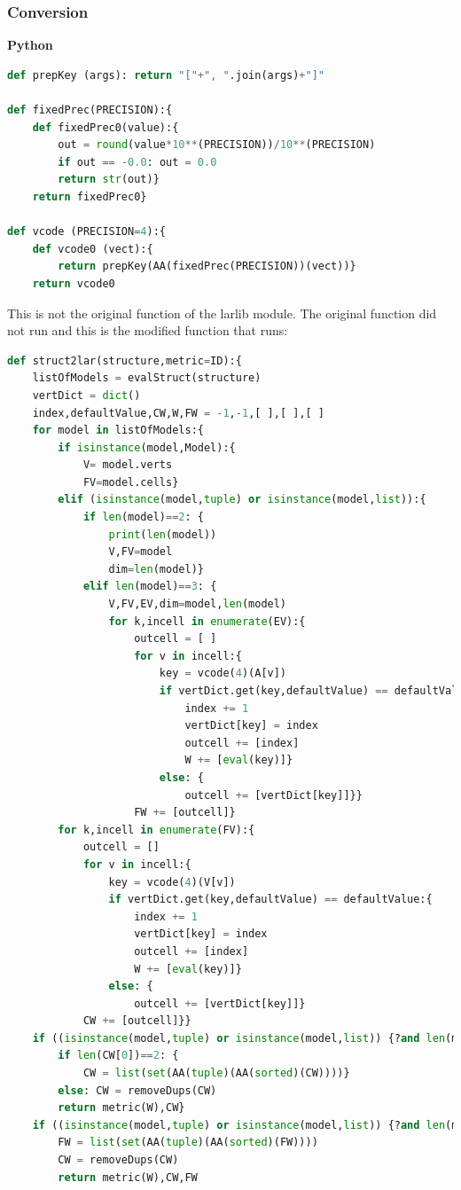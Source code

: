 \documentclass[a4paper,12pt]{article}
\begin{document}
\subsubsection{Conversion}
\textbf{Python}
\begin{lstlisting}[language=Python,format=Julia]
def prepKey (args): return "["+", ".join(args)+"]"

def fixedPrec(PRECISION):{
    def fixedPrec0(value):{
        out = round(value*10**(PRECISION))/10**(PRECISION)
        if out == -0.0: out = 0.0
        return str(out)}
    return fixedPrec0}
    
def vcode (PRECISION=4):{
    def vcode0 (vect):{
        return prepKey(AA(fixedPrec(PRECISION))(vect))}
    return vcode0
\end{lstlisting}
This is not the original function of the larlib module. The original function did not run and this is the modified function that runs:
\begin{lstlisting}[language=Python,format=Julia]
def struct2lar(structure,metric=ID):{
    listOfModels = evalStruct(structure)
    vertDict = dict()
    index,defaultValue,CW,W,FW = -1,-1,[ ],[ ],[ ]        
    for model in listOfModels:{
    	if isinstance(model,Model):{
            V= model.verts
            FV=model.cells}                        
        elif (isinstance(model,tuple) or isinstance(model,list)):{
            if len(model)==2: {
                print(len(model))
                V,FV=model
                dim=len(model)}				
            elif len(model)==3: {
				V,FV,EV,dim=model,len(model)
				for k,incell in enumerate(EV):{
					outcell = [ ]
					for v in incell:{
						key = vcode(4)(A[v])
						if vertDict.get(key,defaultValue) == defaultValue:{
							index += 1
							vertDict[key] = index
							outcell += [index]
							W += [eval(key)]}
						else: {
							outcell += [vertDict[key]]}}
					FW += [outcell]}
        for k,incell in enumerate(FV):{
            outcell = []
            for v in incell:{
                key = vcode(4)(V[v])
                if vertDict.get(key,defaultValue) == defaultValue:{
                    index += 1
                    vertDict[key] = index
                    outcell += [index]
                    W += [eval(key)]}
                else: {
                    outcell += [vertDict[key]]}
            CW += [outcell]}}      
    if ((isinstance(model,tuple) or isinstance(model,list)) {?and len(model)==2) or ((isinstance(model,Model){? and model.n==2)): }}}
        if len(CW[0])==2: {
            CW = list(set(AA(tuple)(AA(sorted)(CW))))}
        else: CW = removeDups(CW)
        return metric(W),CW}
    if ((isinstance(model,tuple) or isinstance(model,list)) {?and len(model)==3): }
        FW = list(set(AA(tuple)(AA(sorted)(FW))))
        CW = removeDups(CW)
        return metric(W),CW,FW
\end{lstlisting}
\end{document}
